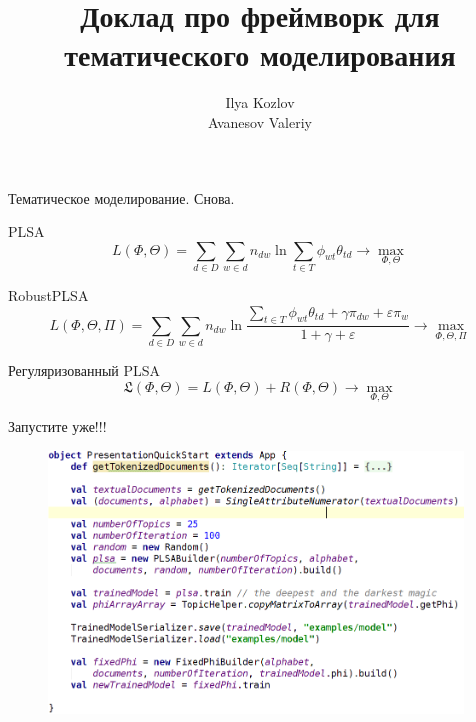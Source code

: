 \documentclass{beamer}
\begin{document}
\title{Доклад про фреймворк для тематического моделирования}  
\author{Ilya Kozlov \\Avanesov Valeriy}




\frame{\titlepage} 

\begin{frame}{Тематическое моделирование. Снова. }
	
	
	\begin{block}{PLSA}
			$$L(\Phi, \Theta) = \sum\limits_{d \in D} \sum\limits_{w \in d} 
	n_{dw} \ln \sum\limits_{t \in T} \phi_{wt}\theta_{td} \rightarrow \max\limits_{\Phi, \Theta}$$
	\end{block}
	\begin{block}{RobustPLSA}
			$$L(\Phi, \Theta, \Pi) = \sum\limits_{d \in D} \sum\limits_{w \in d} 
	n_{dw} \ln \frac{ \sum_{t \in T} \phi_{wt}\theta_{td} + \gamma \pi_{dw} + \varepsilon \pi_w  }{1+\gamma+\varepsilon} \rightarrow \max\limits_{\Phi, \Theta, \Pi}$$	
	\end{block}
	
	\begin{block}{Регуляризованный PLSA}
		$$\mathfrak{L}(\Phi, \Theta) =  L(\Phi, \Theta) + R(\Phi, \Theta) \rightarrow \max\limits_{\Phi, \Theta} $$
	\end{block}
	
\end{frame}

\begin{frame}{Запустите уже!!!}
    \begin{figure}[ht!]
	\centering
	\includegraphics[width=110mm]{quckstart}
	\label{overflow}
    \end{figure}
\end{frame}
\end{document}
